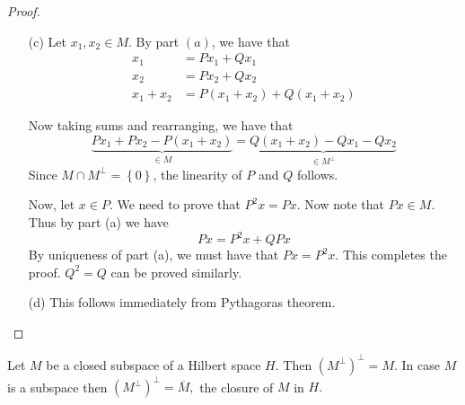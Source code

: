 \begin{proof}
\begin{itemize}
	\item [(c)] Let $x_{1}, x_{2} \in M$. By part $(a)$, we have that 
	    \begin{align*}
		x_{1} &= Px_{1} + Qx_{1} \\
		x_{2} &= Px_{2} + Qx_{2} \\
		x_{1} + x_{2} &= P\left( x_{1} + x_{2} \right) + Q \left( x_{1} + x_{2} \right)
	    \end{align*}

	    Now taking sums and rearranging, we have that
	    \begin{equation*}
		\underbrace{Px_{1} + Px_{2} - P\left( x_{1} + x_{2} \right)}_{\in M} = \underbrace{Q\left( x_{1} + x_{2} \right) - Qx_{1} - Qx_{2}}_{\in M^{\perp}}
	    \end{equation*}
	    Since $M \cap M^{\perp} = \left\{ 0 \right\}$, the linearity of $P$ and $Q$ follows.

	    Now, let $x\in P$. We need to prove that $P^{2}x = Px$. Now note that $Px \in M$. Thus by part (a) we have
	    \begin{equation*}
		Px = P^{2} x + QPx
	    \end{equation*}
	    By uniqueness of part (a), we must have that $Px = P^{2}x$. This completes the proof. $Q^{2}= Q$ can be proved similarly.

	\item [(d)] This follows immediately from Pythagoras theorem.
    \end{itemize}
\end{proof}

\begin{corollary}
Let $M$ be a closed subspace of a Hilbert space $H.$ Then $(M^{\perp})^{\perp} = M.$ In case $M$ is a subspace then $(M^{\perp})^{\perp} = \overline{M},$ the closure of $M$ in $H.$
\label{cor:M-perp-perp}
\end{corollary}



